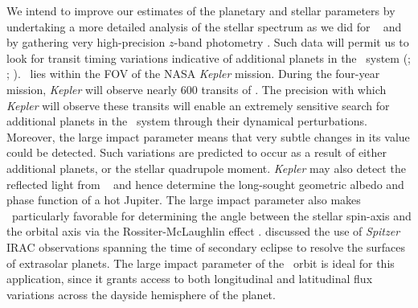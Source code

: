 We intend to improve our estimates of the planetary and stellar
parameters by undertaking a more detailed analysis of the stellar
spectrum as we did for \tresOne\
\citep{Sozzetti_Yong_Torres:apjl:2004a} and by gathering very
high-precision $z$-band photometry
\citep[e.g.,][]{Holman_Winn_Latham:apj:2006a}.  Such data will
permit us to look for transit timing variations indicative of
additional planets in the \tresTwo\ system
(\citealp{Agol_Steffen_Sari:mnras:2005a}; \citealp{Holman_Murray:Science:2005a}; \citealp{Steffen_Agol:mnras:2005a}). \tresTwo\ lies within the FOV of the NASA
\textit{Kepler} mission. During the four-year mission,
\textit{Kepler} will observe nearly 600 transits of \tresTwo.
The precision with which \textit{Kepler} will observe these transits will
enable an extremely sensitive search for additional planets in the \tresTwo\
system through their dynamical perturbations.  Moreover, the large impact
parameter means that very subtle changes in its value could be detected.
Such variations are predicted \citep{Miralda-Escude:apj:2002a} to occur as a result
of either additional planets, or the stellar quadrupole moment. \textit{Kepler}
may also detect the reflected light from \tresTwo\ \citep{Jenkins_Doyle:apj:2003a}
and hence determine the long-sought geometric albedo and phase function of
a hot Jupiter.
The large impact parameter also makes \tresTwo\ particularly
favorable for determining the angle between the stellar spin-axis and the
orbital axis via the Rossiter-McLaughlin effect
\citep{Gaudi_Winn:apj:2007a}.
\citet{Williams_Charbonneau_Cooper:apj:2006a} discussed
the use of {\it Spitzer} IRAC observations spanning the time of
secondary eclipse to resolve the surfaces of extrasolar planets.  The
large impact parameter of the \tresTwo\ orbit is ideal for this
application, since it grants access to both longitudinal and
latitudinal flux variations across the dayside hemisphere of the
planet.

